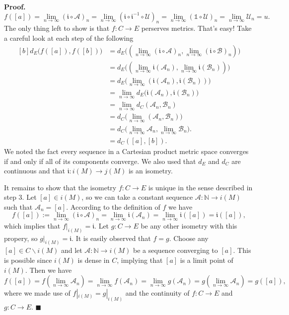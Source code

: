 \documentclass[10pt]{article}
\theoremstyle{definition}
\theoremstyle{remark}
\newenvironment{prf}{\noindent\textbf{Proof.}}{\hfill$\blacksquare$}
\begin{document}
\begin{prf}
\begin{equation}
f([a])=\lim_{n\to\infty}(\mathfrak{i}\circ\mathcal{A})_n
=\lim_{n\to\infty}(\mathfrak{i}\circ\mathfrak{i}^{-1}\circ\mathcal{U})_n
=\lim_{n\to\infty}(\mathds{1}\circ\mathcal{U})_n
=\lim_{n\to\infty}\mathcal{U}_n=u.
\end{equation}
The only thing left to show is that $f:C\to E$ perserves metrics. That's easy! Take a careful look at each step of the following
\begin{equation}
\begin{aligned}[b]
d_E\big(f([a]),f([b])\big) &= d_E\big((\lim_{n\to\infty}(\mathfrak{i}\circ\mathcal{A})_n,\lim_{n\to\infty}(\mathfrak{i}\circ \mathcal{B})_n)\big) \\
&= d_E\big((\lim_{n\to\infty}\mathfrak{i}(\mathcal{A}_n),\lim_{n\to\infty}\mathfrak{i}(\mathcal{B}_n))\big) \\
&= d_E\big(\lim_{n\to\infty}(\mathfrak{i}(\mathcal{A}_n),\mathfrak{i}(\mathcal{B}_n))\big) \\
&= \lim_{n\to\infty}d_E\big(\mathfrak{i}(\mathcal{A}_n),\mathfrak{i}(\mathcal{B}_n)\big) \\
&= \lim_{n\to\infty}d_C(\mathcal{A}_n,\mathcal{B}_n) \\
&= d_C\big(\lim_{n\to\infty}(\mathcal{A}_n,\mathcal{B}_n)\big) \\
&= d_C\big(\lim_{n\to\infty}\mathcal{A}_n,\lim_{n\to\infty}\mathcal{B}_n\big). \\
&= d_C([a],[b]).
\end{aligned}
\end{equation}
We noted the fact every sequence in a Cartesian product metric space converges if and only if all of its components converge. We also used that $d_E$ and $d_C$ are continuous and that $\mathfrak{i}:i(M)\to j(M)$ is an isometry.

It remains to show that the isometry $f:C\to E$ is unique in the sense described in step 3. Let $[a]\in i(M)$, so we can take a constant sequence $\mathcal{A}:\mathbb{N}\to i(M)$ such that $\mathcal{A}_n=[a]$. According to the definition of $f$ we have
\begin{equation}
f([a]):=\lim_{n\to\infty}(\mathfrak{i}\circ\mathcal{A})_n=\lim_{n\to\infty}\mathfrak{i}(\mathcal{A}_n)=\lim_{n\to\infty}\mathfrak{i}([a])=\mathfrak{i}([a]),
\end{equation}
which implies that $f|_{i(M)}=\mathfrak{i}$. Let $g:C\to E$ be any other isometry with this propery, so $g|_{i(M)}=\mathfrak{i}$. It is easily observed that $f=g$. Choose any $[a]\in C\backslash i(M)$ and let $\mathcal{A}:\mathbb{N}\to i(M)$ be a sequence converging to $[a]$. This is possible since $i(M)$ is dense in $C$, implying that $[a]$ is a limit point of $i(M)$. Then we have
\begin{equation}
f([a])=f(\lim_{n\to\infty}\mathcal{A}_n)=\lim_{n\to\infty}f(\mathcal{A}_n)=\lim_{n\to\infty}g(\mathcal{A}_n)=g(\lim_{n\to\infty}\mathcal{A}_n)=g([a]),
\end{equation}
where we made use of $f|_{i(M)}=g|_{i(M)}$ and the continuity of $f:C\to E$ and $g:C\to E$.
\end{prf}
\end{document}
